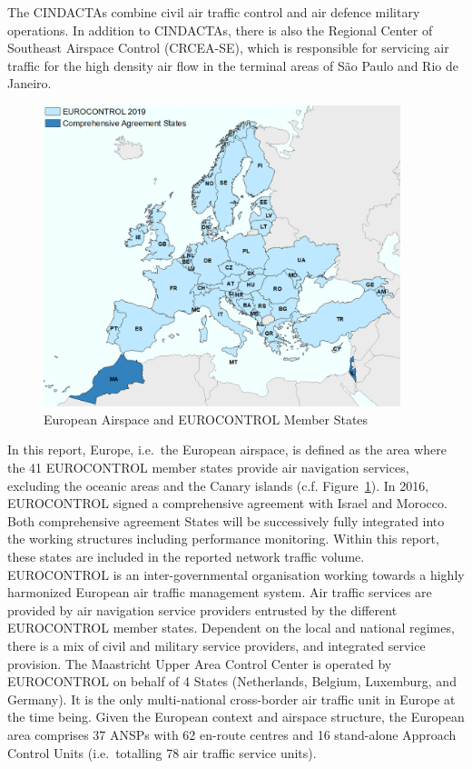 \documentclass[
  a4paper,
  DIV=11,
  numbers=noendperiod]{scrreprt}
\begin{document}
The CINDACTAs combine civil air traffic control and air defence military
operations. In addition to CINDACTAs, there is also the Regional Center
of Southeast Airspace Control (CRCEA-SE), which is responsible for
servicing air traffic for the high density air flow in the terminal
areas of São Paulo and Rio de Janeiro.

\begin{figure}[h]

{\centering \includegraphics[width=4.09in,height=\textheight]{././figures/Europe-ECTRL.png}

}

\caption{\label{fig-EUR-airspace}European Airspace and EUROCONTROL
Member States}

\end{figure}

In this report, Europe, i.e.~the European airspace, is defined as the
area where the 41 EUROCONTROL member states provide air navigation
services, excluding the oceanic areas and the Canary islands (c.f.
Figure~\ref{fig-EUR-airspace}). In 2016, EUROCONTROL signed a
comprehensive agreement with Israel and Morocco. Both comprehensive
agreement States will be successively fully integrated into the working
structures including performance monitoring. Within this report, these
states are included in the reported network traffic volume.\\
EUROCONTROL is an inter-governmental organisation working towards a
highly harmonized European air traffic management system. Air traffic
services are provided by air navigation service providers entrusted by
the different EUROCONTROL member states. Dependent on the local and
national regimes, there is a mix of civil and military service
providers, and integrated service provision. The Maastricht Upper Area
Control Center is operated by EUROCONTROL on behalf of 4 States
(Netherlands, Belgium, Luxemburg, and Germany). It is the only
multi-national cross-border air traffic unit in Europe at the time
being. Given the European context and airspace structure, the European
area comprises 37 ANSPs with 62 en-route centres and 16 stand-alone
Approach Control Units (i.e.~totalling 78 air traffic service units).
\end{document}
